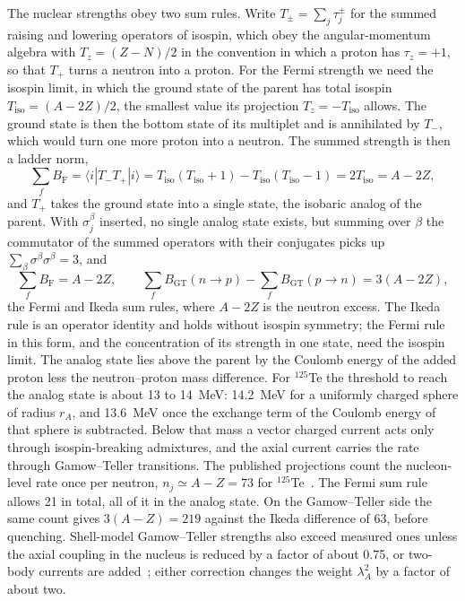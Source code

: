 The nuclear strengths obey two sum rules. Write $T_\pm = \sum_j\tau^\pm_j$ for the summed raising and lowering operators of isospin, which obey the angular-momentum algebra with $T_z = (Z - N)/2$ in the convention in which a proton has $\tau_z = +1$, so that $T_+$ turns a neutron into a proton. For the Fermi strength we need the isospin limit, in which the ground state of the parent has total isospin $T_{\mathrm{iso}} = (A - 2Z)/2$, the smallest value its projection $T_z = -T_{\mathrm{iso}}$ allows. The ground state is then the bottom state of its multiplet and is annihilated by $T_-$, which would turn one more proton into a neutron. The summed strength is then a ladder norm,
\begin{equation*}
  \sum_fB_{\mathrm{F}} = \langle i|T_-T_+|i\rangle = T_{\mathrm{iso}}(T_{\mathrm{iso}} + 1) - T_{\mathrm{iso}}(T_{\mathrm{iso}} - 1) = 2T_{\mathrm{iso}} = A - 2Z ,
\end{equation*}
and $T_+$ takes the ground state into a single state, the isobaric analog of the parent. With $\sigma^\beta_j$ inserted, no single analog state exists, but summing over $\beta$ the commutator of the summed operators with their conjugates picks up $\sum_\beta\sigma^\beta\sigma^\beta = 3$, and
\begin{equation}
  \sum_fB_{\mathrm{F}} = A - 2Z , \qquad
  \sum_fB_{\mathrm{GT}}(n \to p) - \sum_fB_{\mathrm{GT}}(p \to n) = 3(A - 2Z) ,
  \label{eq:22.3-sumrules}
\end{equation}
the Fermi and Ikeda sum rules, where $A - 2Z$ is the neutron excess. The Ikeda rule is an operator identity and holds without isospin symmetry; the Fermi rule in this form, and the concentration of its strength in one state, need the isospin limit. The analog state lies above the parent by the Coulomb energy of the added proton less the neutron--proton mass difference. For $^{125}$Te the threshold to reach the analog state is about 13 to \SI{14}{MeV}: \SI{14.2}{MeV} for a uniformly charged sphere of radius $r_A$, and \SI{13.6}{MeV} once the exchange term of the Coulomb energy of that sphere is subtracted. Below that mass a vector charged current acts only through isospin-breaking admixtures, and the axial current carries the rate through Gamow--Teller transitions. The published projections count the nucleon-level rate once per neutron, $n_j \simeq A - Z = 73$ for $^{125}$Te~\cite[Eq.~(4.6)]{dror2020absorption}. The Fermi sum rule allows 21 in total, all of it in the analog state. On the Gamow--Teller side the same count gives $3(A - Z) = 219$ against the Ikeda difference of 63, before quenching. Shell-model Gamow--Teller strengths also exceed measured ones unless the axial coupling in the nucleus is reduced by a factor of about 0.75, or two-body currents are added~\cite{gysbers2019discrepancy}; either correction changes the weight $\lambda_A^2$ by a factor of about two.

